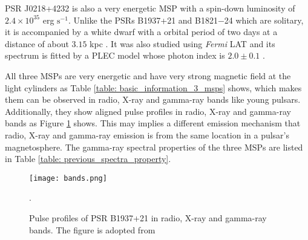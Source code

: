 \documentclass[a4paper, 12pt]{report}
\begin{document}
    PSR J0218+4232 is also a very energetic MSP with a spin-down luminosity of $2.4\times
    10^{35}$ erg $\mbox{s}^{-1}$. Unlike the PSRs B1937+21 and B1821$-$24 which are solitary,
    it is accompanied by a white dwarf with a orbital period of two days at a distance of 
    about $3.15$ kpc \citep{article}. It was also studied using \textit{Fermi} LAT and 
    its spectrum is fitted by a PLEC model whose photon index is $2.0\pm0.1$ 
    \citep{0067-0049-208-2-17}.

    All three MSPs are very energetic and have very strong magnetic field at the light 
    cylinders as Table \ref{table: basic_information_3_msps} shows, which makes them can be 
    observed in radio, X-ray and gamma-ray bands like young pulsars. Additionally, they 
    show aligned pulse profiles in radio, X-ray and gamma-ray bands as Figure
    \ref{fig:class } shows. This may implies a different emission mechanism that radio,
    X-ray and gamma-ray emission is from the same location in a pulsar's magnetosphere. 
    The gamma-ray spectral properties of the three MSPs are listed in Table 
    \ref{table: previous_spectra_property}.  

    \begin{figure}[!htp]   
      \centering
      \texttt{[image: bands.png]}
      \caption{Pulse profiles of PSR B1937+21 in radio, X-ray and gamma-ray bands. 
        The figure is adopted from \citet{0004-637X-787-2-167}}.
      \label{fig:class }
    \end{figure}
    
    \begin{table}[!htp]
      \centering
      \centering
      \caption[Spin and derived properties of PSRs J0218+4232, B1821$-$24 and B1937+21.]
        {Spin and derived properties of PSRs J0218+4232, B1821$-$24 and B1937+21. 
        The data are from the ATNF Pulsar Catalogue \protect \footnotemark}
      \label{table: basic_information_3_msps}
    \end{table}
\end{document}
